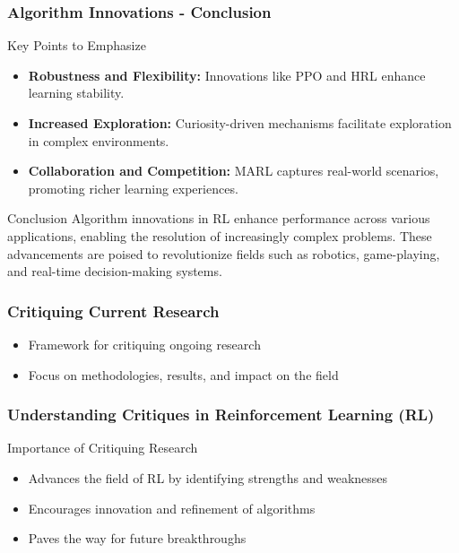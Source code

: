 \documentclass{beamer}
\begin{document}
\begin{frame}[fragile]
    \frametitle{Algorithm Innovations - Conclusion}
    \begin{block}{Key Points to Emphasize}
        \begin{itemize}
            \item \textbf{Robustness and Flexibility:} Innovations like PPO and HRL enhance learning stability.
            \item \textbf{Increased Exploration:} Curiosity-driven mechanisms facilitate exploration in complex environments.
            \item \textbf{Collaboration and Competition:} MARL captures real-world scenarios, promoting richer learning experiences.
        \end{itemize}
    \end{block}

    \begin{block}{Conclusion}
        Algorithm innovations in RL enhance performance across various applications, enabling the resolution of increasingly complex problems. 
        These advancements are poised to revolutionize fields such as robotics, game-playing, and real-time decision-making systems.
    \end{block}
\end{frame}

\begin{frame}
    \frametitle{Critiquing Current Research}
    \begin{itemize}
        \item Framework for critiquing ongoing research
        \item Focus on methodologies, results, and impact on the field
    \end{itemize}
\end{frame}

\begin{frame}
    \frametitle{Understanding Critiques in Reinforcement Learning (RL)}
    \begin{block}{Importance of Critiquing Research}
        \begin{itemize}
            \item Advances the field of RL by identifying strengths and weaknesses
            \item Encourages innovation and refinement of algorithms
            \item Paves the way for future breakthroughs
        \end{itemize}
    \end{block}
\end{frame}
\end{document}
